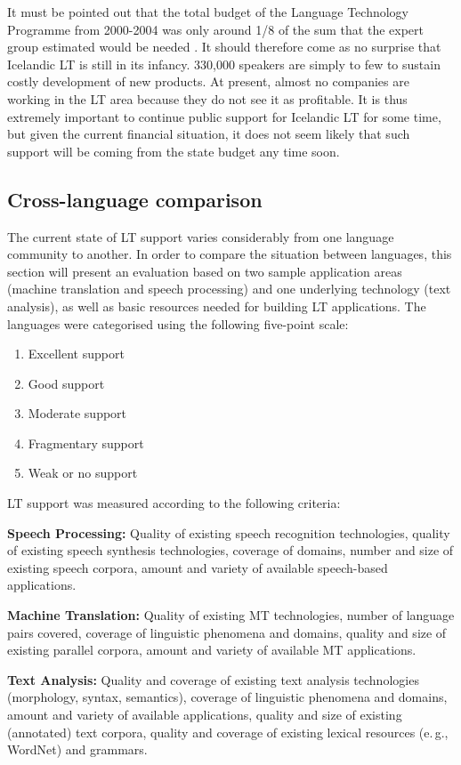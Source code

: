\begin{multicols}{2}
It must be pointed out that the total budget of the Language Technology Programme from 2000-2004 was only around 1/8 of the sum that the expert group estimated would be needed \cite{ilrt1}.  It should therefore come as no surprise that Icelandic LT is still in its infancy. 330,000 speakers are simply to few to sustain costly development of new products. At present, almost no companies are working in the LT area because they do not see it as profitable. It is thus extremely important to continue public support for Icelandic LT for some time, but given the current financial situation, it does not seem likely that such support will be coming from the state budget any time soon.

\subsection{Cross-language comparison}
The current state of LT support varies considerably from one language community to another. In order to compare the situation between languages, this section will present an evaluation based on two sample application areas (machine translation and speech processing) and one underlying technology (text analysis), as well as basic resources needed for building LT applications. The languages were categorised using the following five-point scale: 

\begin{enumerate}
\item Excellent support
\item Good support
\item Moderate support
\item Fragmentary support
\item Weak or no support
\end{enumerate}

LT support was measured according to the following criteria:

\textbf{Speech Processing:} Quality of existing speech recognition technologies, quality of existing speech synthesis technologies, coverage of domains, number and size of existing speech corpora, amount and variety of available speech-based applications.

\textbf{Machine Translation:} Quality of existing MT technologies, number of language pairs covered, coverage of linguistic phenomena and domains, quality and size of existing parallel corpora, amount and variety of available MT applications.

\textbf{Text Analysis:} Quality and coverage of existing text analysis technologies (morphology, syntax, semantics), coverage of linguistic phenomena and domains, amount and variety of available applications, quality and size of existing (annotated) text corpora, quality and coverage of existing lexical resources (e.\,g., WordNet) and grammars.


\end{multicols}
